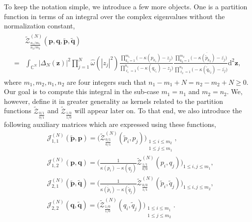 \documentclass[pdflatex,sn-mathphys-num]{sn-jnl}
\theoremstyle{thmstyleone}
\numberwithin{equation}{section}
\newcommand{\C}{\mathbb{C}}
\begin{document}
To keep the notation simple, we introduce a few more objects. One is a partition function in terms of an integral over the complex eigenvalues without the normalization constant,
\begin{align}\label{squaredVandermonde}
\begin{split}
    &\widetilde{\mathscr{Z}}_{\frac{n_{1}/m_{1}}{n_{2}/m_{2}}}^{\left(N\right)}\left(\textbf{p},\textbf{q},\widetilde{\textbf{p}},\widetilde{\textbf{q}}\right)\\
    =&\int_{\C^{N}}^{}\left | \Delta_{N}\left ( \mathbf{z} \right ) \right |^{2}\prod\limits_{j=1}^{N}\widehat{\omega}\left ( \left | z_{j} \right |^{2} \right )\frac{\prod\limits_{k_{1}=1}^{m_{1}}\Big( -\kappa\left( p_{k_{1}} \right) -z_{j} \Big)}{\prod\limits_{\ell_{1}=1}^{n_{1}}\Big( -\kappa\left( q_{\ell_{1}} \right)-z_{j} \Big)}\frac{\prod\limits_{k_{2}=1}^{m_{2}}\Big( -\overline{\kappa\left( \widetilde{p}_{k_{2}} \right)}-\overline{z_{j}} \Big)}{\prod\limits_{\ell_{2}=1}^{n_{2}}\Big( -\overline{\kappa\left( \widetilde{q}_{\ell_{2}} \right)} -\overline{z_{j}} \Big)}\mathrm{d}^{2}\mathbf{z},
\end{split} 
\end{align}
where $m_{1},m_{2},n_{1},n_{2}$ are four integers such that $n_{1}-m_{1}+N=n_{2}-m_{2}+N\geq 0$. Our goal is to compute this integral in the sub-case $m_{1}=n_{1}$ and $m_{2}=n_{2}$. We, however, define it in greater generality as kernels related to the partition functions $\widetilde{\mathscr{Z}}_{\frac{0/1}{0/1}}$ and $\widetilde{\mathscr{Z}}_{\frac{1/0}{1/0}}$ will appear later on. To that end, we also introduce the following auxiliary matrices which are expressed using these functions,
\begin{align}
    &\mathcal{J}^{\left(N\right)}_{1,1}\left ( \widetilde{\textbf{p}},\textbf{p} \right )=\Bigg(\widetilde{\mathscr{Z}}^{\left ( N \right )}_{\frac{0/1}{0/1}}\left ( \widetilde{p}_{i},p_{j} \right )\Bigg)_{\substack{1\leq i\leq m_{2}\\1\leq j\leq m_{1}}} \label{kernel1},
    \\
    &\mathcal{J}^{\left(N\right)}_{1,2}\left ( \textbf{p},\textbf{q} \right )=\Bigg(\frac{1}{\kappa\left(p_{i}\right)-\kappa\left(q_{j}\right)}\widetilde{\mathscr{Z}}^{\left ( N \right )}_{\frac{1/1}{0/0}}\left ( p_{i},q_{j} \right )\Bigg)_{1\leq i,j\leq m_{1}} \label{kernel2},
    \\
    &\mathcal{J}^{\left(N\right)}_{2,1}\left ( \widetilde{\textbf{p}},\widetilde{\textbf{q}} \right )=\Bigg(\frac{1}{\overline{\kappa\left(\widetilde{p}_{i}\right)}-\overline{\kappa\left(\widetilde{q}_{j}\right)}}\widetilde{\mathscr{Z}}^{\left ( N \right )}_{\frac{0/0}{1/1}}\left ( \widetilde{p}_{i},\widetilde{q}_{j} \right )\Bigg)_{1\leq i,j\leq m_{2}}  \label{kernel3},
    \\
    &\mathcal{J}^{\left(N\right)}_{2,2}\left ( \textbf{q},\widetilde{\textbf{q}} \right )=\Bigg(\widetilde{\mathscr{Z}}^{\left ( N \right )}_{\frac{1/0}{1/0}}\left ( q_{i},\widetilde{q}_{j} \right )\Bigg)_{\substack{1\leq i\leq m_{1}\\1\leq j\leq m_{2}}}  \label{kernel4}.
\end{align}
\end{document}
